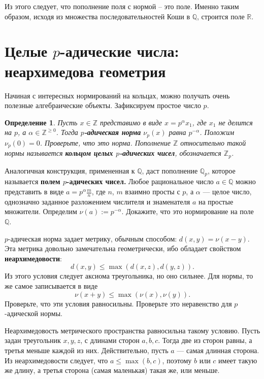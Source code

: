 \documentclass[12pt]{book}
\def\Z{{\mathbb Z}}
\def\R{{\mathbb R}}
\def\Q{{\mathbb Q}}
\theoremstyle{upshape}
\theoremstyle{generic}
\newtheorem{opredelenie}[teorema]{Определение}
\def\еза{\end{remark}}
\theoremstyle{upshapenonumber}
\newcommand{\следствие}{%
     \refstepcounter{teorema}
     {\noindent\bf Следствие \thechapter.\arabic{teorema}:\ }}
\newcommand{\пример}{%
     \refstepcounter{teorema}
     {\noindent\bf Пример \thechapter.\arabic{teorema}:\ }}
\newcommand{\лемма}{%
     \refstepcounter{teorema}
     {\noindent\bf Лемма \thechapter.\arabic{teorema}:\ }}
\newcommand{\теорема}{%
     \refstepcounter{teorema}
     {\noindent\bf Теорема \thechapter.\arabic{teorema}:\ }}
\newcommand{\утверждение}{%
     \refstepcounter{teorema}
     {\noindent\bf Утверждение \thechapter.\arabic{teorema}:\ }}
\def\бф{\bf}
\def\ем{\em}
\def\ез{\end{zadacha}}
\def\еу{\end{ukazanie}}
\def\определение{\begin{opredelenie}}
\def\ео{\end{opredelenie}}
\def\енум{\begin{enumerate}}
\def\ее{\end{enumerate}}
\begin{document}
Из этого следует, что пополнение поля с нормой --
это поле. Именно таким образом, исходя из
множества последовательностей Коши в $\Q$,
строится поле $\R$.


\section{Целые $p$-адические числа: неархимедова геометрия}


Начиная с интересных нормирований на кольцах,
можно получать очень полезные алгебраические объекты. 
Зафиксируем простое число $p$.

\определение
Пусть $x\in \Z$ представимо в виде $x= p^\alpha x_1$, где
$x_1$ не делится на $p$, а $\alpha \in \Z^{\geq 0}$. 
Тогда {\бф $p$-адическая норма} $\nu_p(x)$ равна
$p^{-\alpha}$. Положим $\nu_p(0)=0$. Проверьте,
что это норма. Пополнение $\Z$ относительно такой
нормы называется {\бф кольцом целых $p$-адических чисел},
обозначается $\Z_p$. 
\ео

Аналогичная конструкция, примененная к $\Q$, даст
пополнение $\Q_p$, которое называется {\бф полем 
$p$-адических чисел.} Любое рациональное число $a \in \Q$
можно представить в виде $a = p^\alpha\frac m n$,
где $n$, $m$ взаимно просты с $p$, а $\alpha$ --- 
целое число, однозначно заданное разложением
числителя и знаменателя $a$ на простые множители.
Определим $\nu(a):= p^{-\alpha}$. Докажите, что это
нормирование на поле $\Q$. 

$p$-адическая норма задает метрику, обычным способом:
$d(x,y) = \nu(x-y)$. Эта метрика довольно замечательна
геометрически, ибо обладает свойством {\бф
неархимедовости}:
\[
d(x,y) \leq \max (d(x,z), d(y, z)).
\]
Из этого условия следует аксиома треугольника,
но оно сильнее.
Для нормы, то же самое записывается в виде
\[
\nu(x+y) \leq \max(\nu(x), \nu(y)).
\]
Проверьте, что эти условия равносильны.
Проверьте это неравенство для $p$-адической нормы.

Неархимедовость метрического пространства
равносильна такому условию. Пусть задан треугольник
$x, y, z$, с длинами сторон $a, b, c$. Тогда
две из сторон равны, а третья меньше каждой из них.
Действительно, пусть $a$ --- самая длинная сторона.
Из неархимедовости следует, что $a \leq \max(b, c)$,
поэтому $b$ или $c$ имеет такую же длину, а 
третья сторона (самая маленькая) такая же, или меньше.
\end{document}
